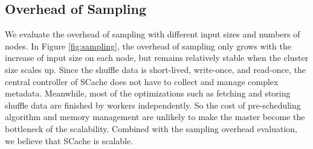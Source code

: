 \subsection{Overhead of Sampling}
We evaluate the overhead of sampling with different input sizes and numbers of nodes. 
In Figure \ref{fig:sampling}, the overhead of sampling only grows with the increase of input size on each node, but remains relatively stable when the cluster size scales up.
Since the shuffle data is short-lived, write-once, and read-once, the central controller of SCache does not have to collect and manage complex metadata. 
Meanwhile, most of the optimizations such as fetching and storing shuffle data are finished by workers independently. 
So the cost of pre-scheduling algorithm and memory management are unlikely to make the master become the bottleneck of the scalability.
Combined with the sampling overhead evaluation, we believe that SCache is scalable.
